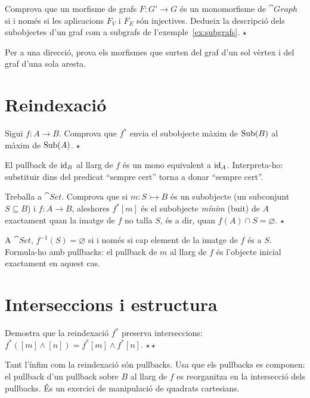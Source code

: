 \begin{exercici}
Comprova que un morfisme de grafs $F\colon G'\to G$ és un monomorfisme de $\cat{Graph}$ si i només si les aplicacions $F_V$ i $F_E$ són injectives. Dedueix la descripció dels subobjectes d'un graf com a subgrafs de l'exemple~\ref{ex:subgrafs}. \hfill{\normalfont$\star$}
\begin{indicacio}
Per a una direcció, prova els morfismes que surten del graf d'un sol vèrtex i del graf d'una sola aresta.
\end{indicacio}
\end{exercici}

\section{Reindexació}

\begin{exercici}
Sigui $f\colon A\to B$. Comprova que $f^{*}$ envia el subobjecte màxim de $\operatorname{Sub}(B)$ al màxim de $\operatorname{Sub}(A)$. \hfill{\normalfont$\star$}
\begin{indicacio}
El pullback de $\operatorname{id}_B$ al llarg de $f$ és un mono equivalent a $\operatorname{id}_A$. Interpreta-ho: substituir dins del predicat \enquote{sempre cert} torna a donar \enquote{sempre cert}.
\end{indicacio}
\end{exercici}

\begin{exercici}
Treballa a $\cat{Set}$. Comprova que si $m\colon S\rightarrowtail B$ és un subobjecte (un subconjunt $S\subseteq B$) i $f\colon A\to B$, aleshores $f^{*}[m]$ és el subobjecte \emph{mínim} (buit) de $A$ exactament quan la imatge de $f$ no talla $S$, és a dir, quan $f(A)\cap S=\varnothing$. \hfill{\normalfont$\star$}
\begin{indicacio}
A $\cat{Set}$, $f^{-1}(S)=\varnothing$ si i només si cap element de la imatge de $f$ és a $S$. Formula-ho amb pullbacks: el pullback de $m$ al llarg de $f$ és l'objecte inicial exactament en aquest cas.
\end{indicacio}
\end{exercici}

\section{Interseccions i estructura}

\begin{exercici}
Demostra que la reindexació $f^{*}$ preserva interseccions: $f^{*}([m]\wedge[n])=f^{*}[m]\wedge f^{*}[n]$. \hfill{\normalfont$\star\star$}
\begin{indicacio}
Tant l'ínfim com la reindexació són pullbacks. Usa que els pullbacks es componen: el pullback d'un pullback sobre $B$ al llarg de $f$ es reorganitza en la intersecció dels pullbacks. És un exercici de manipulació de quadrats cartesians.
\end{indicacio}
\end{exercici}

